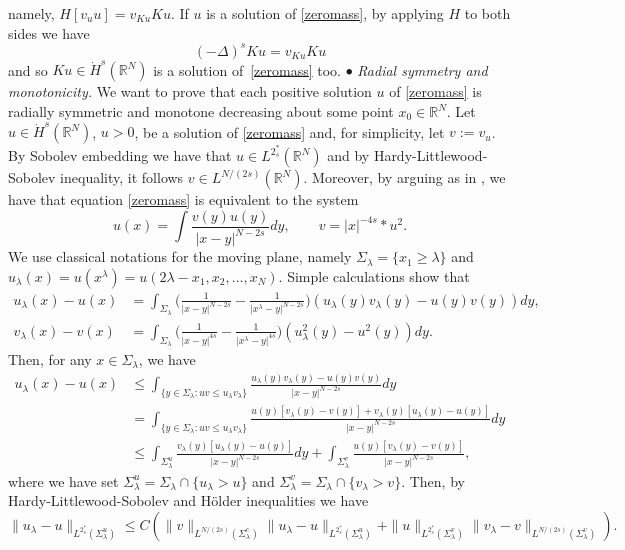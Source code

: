 \documentclass[10pt]{amsart}
\numberwithin{equation}{section}
\begin{document}
namely, $H[v_u u]=v_{Ku} Ku.$
If $u$ is a solution of \eqref{zeromass}, by applying $H$ to both sides we have
$$
(-\Delta)^{s} Ku=v_{Ku} Ku
$$
and so $Ku\in \dot H^{s}(\mathbb R^{N})$ is a solution of~\eqref{zeromass} too. 
\vskip3pt
\noindent
$\bullet$ {\em Radial symmetry and monotonicity.}
We want to prove that each positive solution $u$ of \eqref{zeromass} is radially symmetric and monotone 
decreasing about some point $x_0\in\mathbb{R}^N$.
Let $u\in\dot{H}^s({{\mathbb R}}^N)$, $u>0$, be a solution of \eqref{zeromass} and, for simplicity, let $v:=v_u$. By Sobolev embedding we have that $u\in L^{2^*_s}({{\mathbb R}}^N)$ and by Hardy-Littlewood-Sobolev inequality, it follows $v\in L^{N/(2s)}({{\mathbb R}}^N)$.
Moreover, by arguing as in \cite[Theorem 4.5]{classif}, we have that equation \eqref{zeromass} is equivalent to the system
\begin{equation}
\label{integral-f}
u(x)=\int \frac{v(y)u(y)}{|x-y|^{N-2s}}dy,\qquad v=|x|^{-4s}*u^2.
\end{equation}
We use classical notations for the moving plane, namely
$\Sigma_\lambda=\{x_1\geq\lambda\}$ and $u_\lambda(x)=u(x^\lambda)=u(2\lambda-x_1,x_2,\ldots,x_N)$.
Simple calculations show that
\begin{align*}
u_\lambda (x) - u(x) 
&=
\int_{\Sigma_\lambda} \Big(\frac{1}{|x-y|^{N-2s}}-\frac{1}{|x^\lambda-y|^{N-2s}}\Big)\left(u_\lambda(y)v_\lambda(y)-u(y)v(y)\right)dy, \\
v_\lambda (x) - v(x)
&=
\int_{\Sigma_\lambda} \Big(\frac{1}{|x-y|^{4s}}-\frac{1}{|x^\lambda-y|^{4s}}\Big)\left(u_\lambda^2(y)-u^2(y)\right)dy.
\end{align*}
Then, for any $x\in\Sigma_\lambda$, we have
\begin{align*}
u_\lambda (x) - u(x) 
&\leq
\int_{\{y\in \Sigma_\lambda : uv \leq u_\lambda v_\lambda\}} \frac{u_\lambda(y)v_\lambda(y)-u(y)v(y)}{|x-y|^{N-2s}}dy\\
&=
\int_{\{y\in \Sigma_\lambda : uv \leq u_\lambda v_\lambda\}} \frac{u(y)[v_\lambda(y)-v(y)]+ v_\lambda(y)[u_\lambda(y)-u(y)]}{|x-y|^{N-2s}}dy\\
& \leq
\int_{\Sigma_\lambda^u} \frac{ v_\lambda(y)[u_\lambda(y)-u(y)]}{|x-y|^{N-2s}}dy
+ \int_{\Sigma_\lambda^v} \frac{u(y)[v_\lambda(y)-v(y)]}{|x-y|^{N-2s}},
\end{align*}
where we have set $\Sigma_\lambda^u=\Sigma_\lambda\cap\{u_\lambda>u\}$ and
$\Sigma_\lambda^v=\Sigma_\lambda\cap\{v_\lambda>v\}.$
Then, by Hardy-Littlewood-Sobolev and H\"older inequalities we have
\begin{equation}
\label{eq:dismiao1}
\|u_\lambda - u\|_{L^{2^*_s}(\Sigma_\lambda^u)} 
\leq 
C(\|v\|_{L^{N/(2s)}(\Sigma_\lambda^c)} \|u_\lambda - u\|_{L^{2^*_s}(\Sigma_\lambda^u)}
+ \|u\|_{L^{2^*_s}(\Sigma_\lambda^v)} \|v_\lambda - v\|_{L^{N/(2s)}(\Sigma_\lambda^v)}).
\end{equation}
\end{document}
